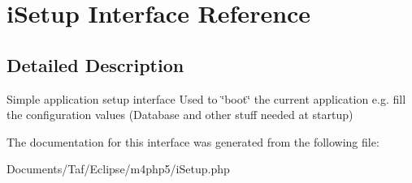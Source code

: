 \hypertarget{interfaceiSetup}{
\section{iSetup Interface Reference}
\label{interfaceiSetup}
}


\subsection{Detailed Description}
Simple application setup interface Used to \char`\"{}boot\char`\"{} the current application e.g. fill the configuration values (Database and other stuff needed at startup) 

The documentation for this interface was generated from the following file:\begin{CompactItemize}
\item 
Documents/Taf/Eclipse/m4php5/iSetup.php\end{CompactItemize}
